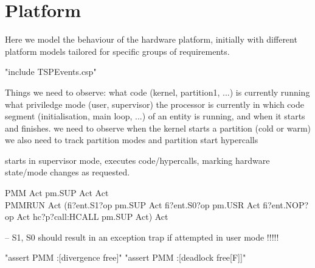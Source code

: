 \section{Platform}

 Here we model the behaviour of the hardware platform, initially with different
 platform models tailored for specific groups of requirements.
%
\begin{assert}
"include TSPEvents.csp"
\end{assert}


Things we need to observe:
  what code (kernel, partition1, ...) is currently running
  what priviledge mode (user, supervisor) the processor is currently in
  which code segment (initialisation, main loop, ...) of an entity is running,
    and when it starts and finishes.
  we need to observe when the kernel starts a partition (cold or warm)
  we also need to track partition modes and partition start hypercalls

starts in supervisor mode, executes code/hypercalls,
marking hardware state/mode changes as requested.
\begin{circus}
\circprocess PMM \circdef \circbegin Act \circdef pm.SUP \then Act \circspot Act \circend\\

\circprocess PMMRUN \circdef
\circbegin
  Act \circdef (fi?ent.S1?op \then pm.SUP \then Act
   \extchoice
   fi?ent.S0?op \then pm.USR \then Act
   \extchoice
   fi?ent.NOP?op \then Act
   \extchoice
   hc?p?call:HCALL \then pm.SUP \then Act)
   \circspot Act
\circend
\end{circus}
-- S1, S0 should result in an exception trap if attempted in user mode !!!!!

\begin{assert}
"assert PMM :[divergence free]"
\also "assert PMM :[deadlock free[F]]"
\end{assert}
